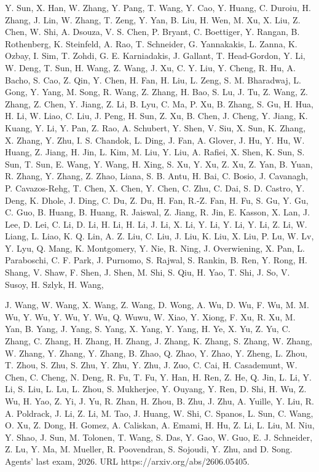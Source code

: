 Y. Sun, X. Han, W. Zhang, Y. Pang, T. Wang, Y. Cao, Y. Huang, C. Duroiu,
H. Zhang, J. Lin, W. Zhang, T. Zeng, Y. Yan, B. Liu, H. Wen, M. Xu, X.
Liu, Z. Chen, W. Shi, A. Dsouza, V. S. Chen, P. Bryant, C. Boettiger, Y.
Rangan, B. Rothenberg, K. Steinfeld, A. Rao, T. Schneider, G.
Yannakakis, L. Zanna, K. Ozbay, I. Sim, T. Zohdi, G. E. Karniadakis, J.
Gallant, T. Head-Gordon, Y. Li, W. Deng, T. Sun, H. Wang, Z. Wang, J.
Xu, C. Y. Liu, Y. Cheng, R. Hu, A. Bacho, S. Cao, Z. Qin, Y. Chen, H.
Fan, H. Liu, L. Zeng, S. M. Bharadwaj, L. Gong, Y. Yang, M. Song, R.
Wang, Z. Zhang, H. Bao, S. Lu, J. Tu, Z. Wang, Z. Zhang, Z. Chen, Y.
Jiang, Z. Li, B. Lyu, C. Ma, P. Xu, B. Zhang, S. Gu, H. Hua, H. Li, W.
Liao, C. Liu, J. Peng, H. Sun, Z. Xu, B. Chen, J. Cheng, Y. Jiang, K.
Kuang, Y. Li, Y. Pan, Z. Rao, A. Schubert, Y. Shen, V. Siu, X. Sun, K.
Zhang, X. Zhang, Y. Zhu, I. S. Chandok, L. Ding, J. Fan, A. Glover, J.
Hu, Y. Hu, W. Huang, Z. Jiang, H. Jin, L. Kim, M. Liu, Y. Liu, A.
Rafiei, X. Shen, K. Sun, S. Sun, T. Sun, E. Wang, Y. Wang, H. Xing, S.
Xu, Y. Xu, Z. Xu, Z. Yan, B. Yuan, R. Zhang, Y. Zhang, Z. Zhao, Liana,
S. B. Antu, H. Bai, C. Bosio, J. Cavanagh, P. Cavazos-Rehg, T. Chen, X.
Chen, Y. Chen, C. Zhu, C. Dai, S. D. Castro, Y. Deng, K. Dhole, J. Ding,
C. Du, Z. Du, H. Fan, R.-Z. Fan, H. Fu, S. Gu, Y. Gu, C. Guo, B. Huang,
B. Huang, R. Jaiswal, Z. Jiang, R. Jin, E. Kasson, X. Lan, J. Lee, D.
Lei, C. Li, D. Li, H. Li, H. Li, J. Li, X. Li, Y. Li, Y. Li, Y. Li, Z.
Li, W. Liang, L. Liao, K. Q. Lin, A. Z. Liu, C. Liu, J. Liu, K. Liu, X.
Liu, P. Lu, W. Lv, Y. Lyu, Q. Mang, K. Montgomery, Y. Nie, R. Ning, J.
Overwiening, X. Pan, L. Paraboschi, C. F. Park, J. Purnomo, S. Rajwal,
S. Rankin, B. Ren, Y. Rong, H. Shang, V. Shaw, F. Shen, J. Shen, M. Shi,
S. Qiu, H. Yao, T. Shi, J. So, V. Susoy, H. Szlyk, H. Wang,



J. Wang, W. Wang, X. Wang, Z. Wang, D. Wong, A. Wu, D. Wu, F. Wu, M. M.
Wu, Y. Wu, Y. Wu, Y. Wu, Q. Wuwu, W. Xiao, Y. Xiong, F. Xu, R. Xu, M.
Yan, B. Yang, J. Yang, S. Yang, X. Yang, Y. Yang, H. Ye, X. Yu, Z. Yu,
C. Zhang, C. Zhang, H. Zhang, H. Zhang, J. Zhang, K. Zhang, S. Zhang, W.
Zhang, W. Zhang, Y. Zhang, Y. Zhang, B. Zhao, Q. Zhao, Y. Zhao, Y.
Zheng, L. Zhou, T. Zhou, S. Zhu, S. Zhu, Y. Zhu, Y. Zhu, J. Zuo, C. Cai,
H. Casademunt, W. Chen, C. Cheng, N. Deng, R. Fu, T. Fu, Y. Han, H. Ren,
Z. He, Q. Jin, L. Li, Y. Li, S. Liu, L. Lu, L. Zhou, S. Mukherjee, Y.
Ouyang, Y. Ren, D. Shi, H. Wu, Z. Wu, H. Yao, Z. Yi, J. Yu, R. Zhan, H.
Zhou, B. Zhu, J. Zhu, A. Yuille, Y. Liu, R. A. Poldrack, J. Li, Z. Li,
M. Tao, J. Huang, W. Shi, C. Spanos, L. Sun, C. Wang, O. Xu, Z. Dong, H.
Gomez, A. Caliskan, A. Emami, H. Hu, Z. Li, L. Liu, M. Niu, Y. Shao, J.
Sun, M. Tolonen, T. Wang, S. Das, Y. Gao, W. Guo, E. J. Schneider, Z.
Lu, Y. Ma, M. Mueller, R. Poovendran, S. Sojoudi, Y. Zhu, and D. Song.
Agents' last exam, 2026. URL https://arxiv.org/abs/2606.05405.

